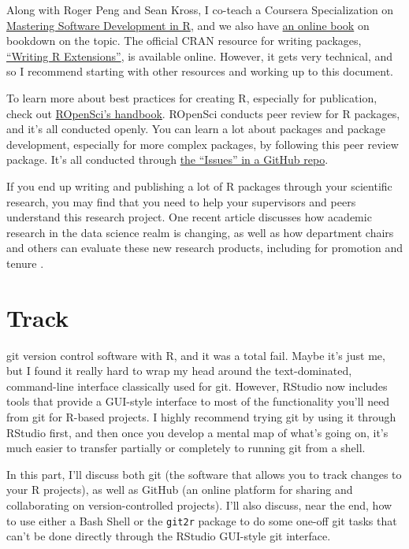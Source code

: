 \documentclass[]{tufte-book}
\begin{document}
Along with Roger Peng and Sean Kross, I co-teach a Coursera Specialization on
\href{https://www.coursera.org/specializations/r}{Mastering Software Development in
R}, and we also have \href{https://bookdown.org/rdpeng/RProgDA/}{an online
book} on bookdown on the topic. The
official CRAN resource for writing packages, \href{https://cran.r-project.org/doc/manuals/r-release/R-exts.html}{``Writing R
Extensions''}, is
available online. However, it gets very technical, and so I recommend starting
with other resources and working up to this document.

To learn more about best practices for creating R, especially for publication,
check out \href{https://ropensci.github.io/dev_guide/}{ROpenSci's handbook}. ROpenSci
conducts peer review for R packages, and it's all conducted openly. You can
learn a lot about packages and package development, especially for more complex
packages, by following this peer review package. It's all conducted through \href{https://github.com/ropensci/software-review/issues}{the
``Issues'' in a GitHub repo}.

If you end up writing and publishing a lot of R packages through your scientific
research, you may find that you need to help your supervisors and peers
understand this research project. One recent article discusses how academic
research in the data science realm is changing, as well as how department chairs
and others can evaluate these new research products, including for promotion and
tenure \citep{waller2018documenting}.

\hypertarget{track}{%
\chapter{Track}\label{track}}

 git version control software with R, and
it was a total fail. Maybe it's just me, but I found it really hard to wrap my head around
the text-dominated, command-line interface classically used for git. However, RStudio now
includes tools that provide a GUI-style
interface to most of the functionality you'll need from git for R-based projects. I highly
recommend trying git by using it through RStudio first, and then once you develop a mental
map of what's going on, it's much easier to transfer partially or completely to running git
from a shell.

In this part, I'll discuss both git (the software that allows you to track changes to your
R projects), as well as GitHub (an online platform for sharing and collaborating on
version-controlled projects). I'll also discuss, near the end, how to use either a Bash
Shell or the \texttt{git2r} package to do some one-off git tasks that can't be done directly through
the RStudio GUI-style git interface.
\end{document}
